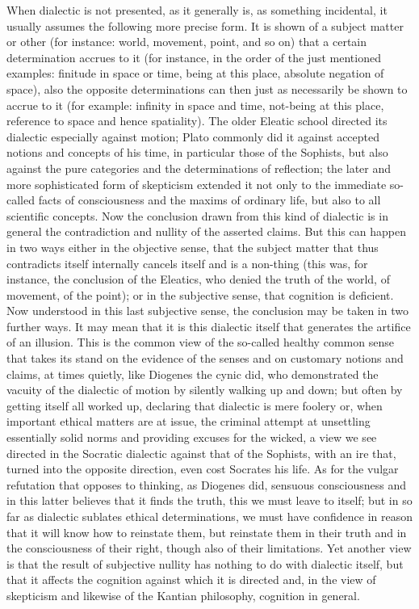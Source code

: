 When dialectic is not presented, as it generally is,
as something incidental, it usually assumes
the following more precise form.
It is shown of a subject matter or other
(for instance: world, movement, point, and so on)
that a certain determination accrues to it
(for instance, in the order of the just mentioned examples:
finitude in space or time, being at this place,
absolute negation of space),
also the opposite determinations can then
just as necessarily be shown to accrue to it
(for example: infinity in space and time,
not-being at this place, reference to space and hence spatiality).
The older Eleatic school directed
its dialectic especially against motion;
Plato commonly did it against accepted
notions and concepts of his time,
in particular those of the Sophists,
but also against the pure categories
and the determinations of reflection;
the later and more sophisticated form of skepticism
extended it not only to the immediate so-called facts of consciousness
and the maxims of ordinary life,
but also to all scientific concepts.
Now the conclusion drawn from this kind of dialectic is
in general the contradiction and nullity of the asserted claims.
But this can happen in two ways either in the objective sense,
that the subject matter that thus contradicts itself
internally cancels itself and is a non-thing
(this was, for instance, the conclusion of the Eleatics,
who denied the truth of the world, of movement, of the point);
or in the subjective sense, that cognition is deficient.
Now understood in this last subjective sense,
the conclusion may be taken in two further ways.
It may mean that it is this dialectic itself
that generates the artifice of an illusion.
This is the common view of the so-called healthy
common sense that takes its stand on the evidence of the senses
and on customary notions and claims,
at times quietly, like Diogenes the cynic did,
who demonstrated the vacuity of the dialectic of motion
by silently walking up and down;
but often by getting itself all worked up,
declaring that dialectic is mere foolery or,
when important ethical matters are at issue,
the criminal attempt at unsettling essentially solid norms
and providing excuses for the wicked,
a view we see directed in the Socratic dialectic
against that of the Sophists, with an ire that,
turned into the opposite direction,
even cost Socrates his life.
As for the vulgar refutation that opposes to thinking,
as Diogenes did, sensuous consciousness
and in this latter believes that it finds the truth,
this we must leave to itself;
but in so far as dialectic sublates ethical determinations,
we must have confidence in reason that it will
know how to reinstate them,
but reinstate them in their truth
and in the consciousness of their right,
though also of their limitations.
Yet another view is that the
result of subjective nullity has
nothing to do with dialectic itself,
but that it affects the cognition
against which it is directed
and, in the view of skepticism
and likewise of the Kantian philosophy,
cognition in general.

